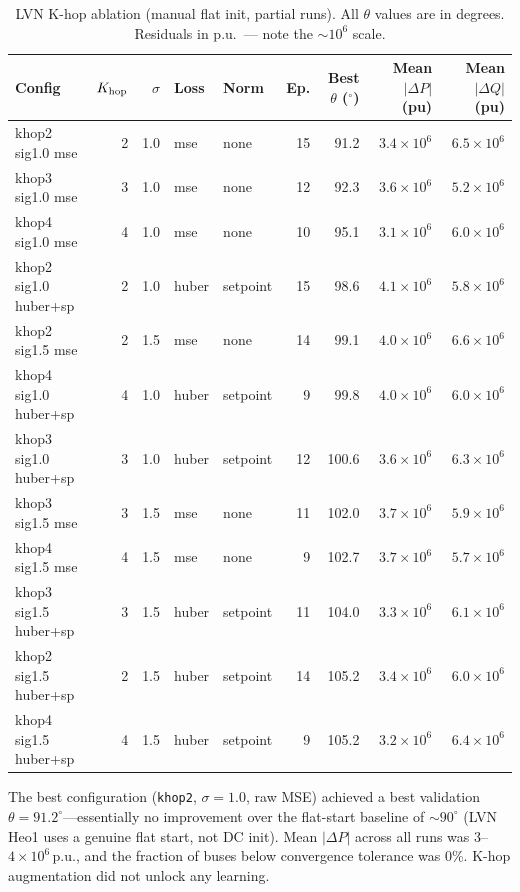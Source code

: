 \documentclass{article}
\begin{document}
\begin{table}[h]
\centering
\scriptsize
\caption{LVN K-hop ablation (manual flat init, partial runs).
  All $\theta$ values are in degrees.
  Residuals in p.u.\ --- note the $\sim10^6$ scale.}
\label{tab:lvn_khop}
\setlength{\tabcolsep}{3pt}
\begin{tabular}{lrrllrrrr}
\toprule
Config & $K_{\rm hop}$ & $\sigma$ & Loss & Norm
  & Ep. & Best $\theta$ ($^\circ$) & Mean $|\Delta P|$ (pu) & Mean $|\Delta Q|$ (pu) \\
\midrule
khop2 sig1.0 mse        & 2 & 1.0 & mse   & none     & 15 & 91.2  & $3.4\times10^6$ & $6.5\times10^6$ \\
khop3 sig1.0 mse        & 3 & 1.0 & mse   & none     & 12 & 92.3  & $3.6\times10^6$ & $5.2\times10^6$ \\
khop4 sig1.0 mse        & 4 & 1.0 & mse   & none     & 10 & 95.1  & $3.1\times10^6$ & $6.0\times10^6$ \\
khop2 sig1.0 huber+sp   & 2 & 1.0 & huber & setpoint & 15 & 98.6  & $4.1\times10^6$ & $5.8\times10^6$ \\
khop2 sig1.5 mse        & 2 & 1.5 & mse   & none     & 14 & 99.1  & $4.0\times10^6$ & $6.6\times10^6$ \\
khop4 sig1.0 huber+sp   & 4 & 1.0 & huber & setpoint & 9  & 99.8  & $4.0\times10^6$ & $6.0\times10^6$ \\
khop3 sig1.0 huber+sp   & 3 & 1.0 & huber & setpoint & 12 & 100.6 & $3.6\times10^6$ & $6.3\times10^6$ \\
khop3 sig1.5 mse        & 3 & 1.5 & mse   & none     & 11 & 102.0 & $3.7\times10^6$ & $5.9\times10^6$ \\
khop4 sig1.5 mse        & 4 & 1.5 & mse   & none     & 9  & 102.7 & $3.7\times10^6$ & $5.7\times10^6$ \\
khop3 sig1.5 huber+sp   & 3 & 1.5 & huber & setpoint & 11 & 104.0 & $3.3\times10^6$ & $6.1\times10^6$ \\
khop2 sig1.5 huber+sp   & 2 & 1.5 & huber & setpoint & 14 & 105.2 & $3.4\times10^6$ & $6.0\times10^6$ \\
khop4 sig1.5 huber+sp   & 4 & 1.5 & huber & setpoint & 9  & 105.2 & $3.2\times10^6$ & $6.4\times10^6$ \\
\bottomrule
\end{tabular}
\end{table}

The best configuration (\texttt{khop2}, $\sigma{=}1.0$, raw MSE) achieved
a best validation $\theta = 91.2^\circ$---essentially no improvement over
the flat-start baseline of $\sim90^\circ$ (LVN Heo1 uses a genuine flat start, not DC init).  Mean $|\Delta P|$ across all
runs was $3$--$4\times10^6$\,p.u., and the fraction of buses below
convergence tolerance was $0\%$.  K-hop augmentation did not unlock any
learning.
\end{document}
